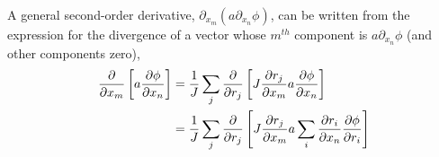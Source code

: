 A general second-order derivative, $\partial_{x_m}( a \partial_{x_n} \phi)$,
can be written from the expression for the divergence of a vector whose $m^{th}$ component is
$a \partial_{x_n} \phi$ (and other components zero),
\begin{align*}
{\partial\over\partial x_m}\left[ a  {\partial\phi\over\partial x_n} \right]
     & = {1\over J} \sum_j 
            {\partial\over\partial r_j}\left[  J{\partial r_j \over \partial x_m }
                  a  {\partial\phi\over\partial x_n}  \right] \\
     & = {1\over J} \sum_j 
            {\partial\over\partial r_j}\left[  J{\partial r_j \over \partial x_m }
                  a  \sum_i {\partial r_i \over\partial x_n}{\partial\phi\over\partial r_i} \right]
\end{align*}


